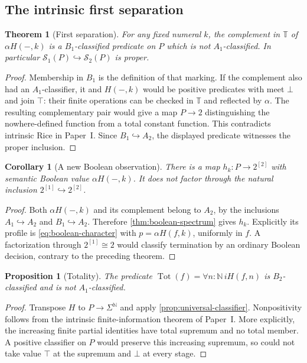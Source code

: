 \documentclass[11pt,a4paper]{article}
\numberwithin{equation}{section}
\newtheorem{theorem}{Theorem}[section]
\newtheorem{proposition}[proposition]{Proposition}
\newtheorem{corollary}[corollary]{Corollary}
\theoremstyle{definition}
\theoremstyle{remark}
\theoremstyle{plain}
\newcommand{\N}{\mathbb N}
\newcommand{\TV}{\mathbb T}
\newcommand{\incl}{\hookrightarrow}
\newcommand{\SSn}{\mathcal S}
\newcommand{\Tot}{\operatorname{Tot}}
\begin{document}
\subsection{The intrinsic first separation}

\begin{theorem}[First separation]
\label{thm:first-separation}
For any fixed numeral $k$, the complement in $\TV$ of
$\alpha H(-,k)$ is a $B_1$-classified predicate on $P$ which is not
$A_1$-classified. In particular $\SSn_1(P)\incl\SSn_2(P)$ is proper.
\end{theorem}
\begin{proof}
Membership in $B_1$ is the definition of that marking. If the complement
also had an $A_1$-classifier, it and $H(-,k)$ would be positive
predicates with meet $\bot$ and join $\top$: their finite operations
can be checked in $\TV$ and reflected by $\alpha$. The resulting
complementary pair would give a map $P\to2$ distinguishing the
nowhere-defined function from a total constant function. This
contradicts intrinsic Rice in Paper~I. Since $B_1\incl A_2$, the
displayed predicate witnesses the proper inclusion.
\end{proof}

\begin{corollary}[A new Boolean observation]
\label{cor:new-boolean-map}
There is a map $h_k:P\to2^{[2]}$ with semantic Boolean value
$\alpha H(-,k)$. It does not factor through the natural inclusion
$2^{[1]}\incl2^{[2]}$.
\end{corollary}
\begin{proof}
Both $\alpha H(-,k)$ and its complement belong to $A_2$, by the
inclusions $A_1\incl A_2$ and $B_1\incl A_2$. Therefore
\cref{thm:boolean-spectrum} gives $h_k$. Explicitly its profile is
\eqref{eq:boolean-character} with $p=\alpha H(f,k)$, uniformly in
$f$. A factorization through $2^{[1]}\cong2$ would classify
termination by an ordinary Boolean decision, contrary to the preceding
theorem.
\end{proof}

\begin{proposition}[Totality]
\label{prop:totality-classification}
The predicate
$\Tot(f)=\forall n:\N\,iH(f,n)$ is $B_2$-classified and is not
$A_1$-classified.
\end{proposition}
\begin{proof}
Transpose $H$ to $P\to\Sigma^{\N}$ and apply
\cref{prop:universal-classifier}. Nonpositivity follows from the
intrinsic finite-information theorem of Paper~I. More explicitly, the
increasing finite partial identities have total supremum and no total
member. A positive classifier on $P$ would preserve this increasing
supremum, so could not take value $\top$ at the supremum and $\bot$
at every stage.
\end{proof}
\end{document}
